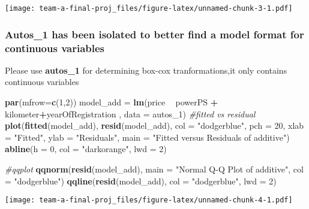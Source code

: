 \documentclass[]{article}
\newenvironment{Shaded}{\begin{snugshade}}{\end{snugshade}}
\newcommand{\CommentTok}[1]{\textcolor[rgb]{0.56,0.35,0.01}{\textit{#1}}}
\newcommand{\DataTypeTok}[1]{\textcolor[rgb]{0.13,0.29,0.53}{#1}}
\newcommand{\DecValTok}[1]{\textcolor[rgb]{0.00,0.00,0.81}{#1}}
\newcommand{\KeywordTok}[1]{\textcolor[rgb]{0.13,0.29,0.53}{\textbf{#1}}}
\newcommand{\NormalTok}[1]{#1}
\newcommand{\OperatorTok}[1]{\textcolor[rgb]{0.81,0.36,0.00}{\textbf{#1}}}
\newcommand{\StringTok}[1]{\textcolor[rgb]{0.31,0.60,0.02}{#1}}
\begin{document}
\texttt{[image: team-a-final-proj\_files/figure-latex/unnamed-chunk-3-1.pdf]}

\hypertarget{autos_1-has-been-isolated-to-better-find-a-model-format-for-continuous-variables}{%
\subsubsection{Autos\_1 has been isolated to better find a model format
for continuous
variables}\label{autos_1-has-been-isolated-to-better-find-a-model-format-for-continuous-variables}}

Please use \textbf{autos\_1} for determining box-cox tranformations,it
only contains continuous variables

\begin{Shaded}
\begin{Highlighting}[]
\KeywordTok{par}\NormalTok{(}\DataTypeTok{mfrow=}\KeywordTok{c}\NormalTok{(}\DecValTok{1}\NormalTok{,}\DecValTok{2}\NormalTok{))}
\NormalTok{model_add =}\StringTok{ }\KeywordTok{lm}\NormalTok{(price }\OperatorTok{~}\StringTok{ }\NormalTok{powerPS }\OperatorTok{+}\StringTok{ }\NormalTok{kilometer}\OperatorTok{+}\NormalTok{yearOfRegistration , }\DataTypeTok{data =}\NormalTok{ autos_}\DecValTok{1}\NormalTok{)}
\CommentTok{#fitted vs residual}
\KeywordTok{plot}\NormalTok{(}\KeywordTok{fitted}\NormalTok{(model_add), }\KeywordTok{resid}\NormalTok{(model_add), }\DataTypeTok{col =} \StringTok{"dodgerblue"}\NormalTok{, }\DataTypeTok{pch =} \DecValTok{20}\NormalTok{,}
     \DataTypeTok{xlab =} \StringTok{"Fitted"}\NormalTok{, }\DataTypeTok{ylab =} \StringTok{"Residuals"}\NormalTok{, }\DataTypeTok{main =} \StringTok{"Fitted versus Residuals of additive"}\NormalTok{)}
\KeywordTok{abline}\NormalTok{(}\DataTypeTok{h =} \DecValTok{0}\NormalTok{, }\DataTypeTok{col =} \StringTok{"darkorange"}\NormalTok{, }\DataTypeTok{lwd =} \DecValTok{2}\NormalTok{)}

\CommentTok{#qqplot}
\KeywordTok{qqnorm}\NormalTok{(}\KeywordTok{resid}\NormalTok{(model_add), }\DataTypeTok{main =} \StringTok{"Normal Q-Q Plot of additive"}\NormalTok{, }\DataTypeTok{col =} \StringTok{"dodgerblue"}\NormalTok{)}
\KeywordTok{qqline}\NormalTok{(}\KeywordTok{resid}\NormalTok{(model_add), }\DataTypeTok{col =} \StringTok{"dodgerblue"}\NormalTok{, }\DataTypeTok{lwd =} \DecValTok{2}\NormalTok{)}
\end{Highlighting}
\end{Shaded}

\texttt{[image: team-a-final-proj\_files/figure-latex/unnamed-chunk-4-1.pdf]}
\end{document}
